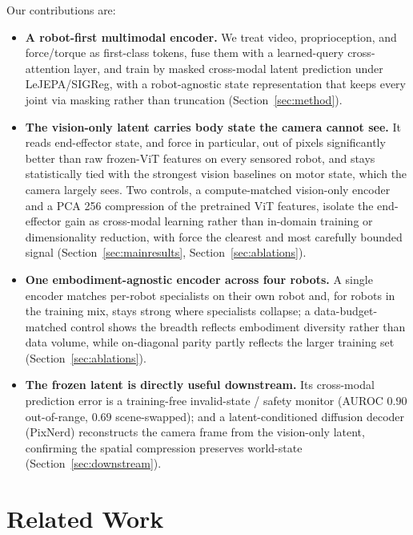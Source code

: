 \documentclass{article}
\begin{document}
Our contributions are:
\begin{itemize}
  \item \textbf{A robot-first multimodal encoder.} We treat video, proprioception,
        and force/torque as first-class tokens, fuse them with a learned-query cross-attention layer, and train by masked cross-modal latent prediction under LeJEPA/SIGReg, with a robot-agnostic state representation that keeps every joint via masking rather than truncation (Section~\ref{sec:method}).
  \item \textbf{The vision-only latent carries body state the camera cannot see.}
        It reads end-effector state, and force in particular, out of pixels significantly better than raw frozen-ViT features on every sensored robot, and stays statistically tied with the strongest vision baselines on motor state, which the camera largely sees. Two controls, a compute-matched vision-only encoder and a PCA 256 compression of the pretrained ViT features, isolate the end-effector gain as cross-modal learning rather than in-domain training or dimensionality reduction, with force the clearest and most carefully bounded signal (Section~\ref{sec:mainresults}, Section~\ref{sec:ablations}).
  \item \textbf{One embodiment-agnostic encoder across four robots.} A single
        encoder matches per-robot specialists on their own robot and, for robots in the training mix, stays strong where specialists collapse; a data-budget-matched control shows the breadth reflects embodiment diversity rather than data volume, while on-diagonal parity partly reflects the larger training set (Section~\ref{sec:ablations}).
  \item \textbf{The frozen latent is directly useful downstream.} Its cross-modal
        prediction error is a training-free invalid-state / safety monitor (AUROC $0.90$ out-of-range, $0.69$ scene-swapped); and a latent-conditioned diffusion decoder (PixNerd) reconstructs the camera frame from the vision-only latent, confirming the spatial compression preserves world-state (Section~\ref{sec:downstream}).
\end{itemize}


\section{Related Work}
\label{sec:related}
\end{document}
